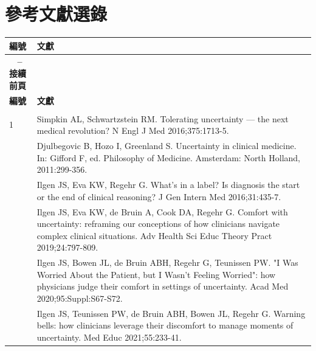\documentclass[12pt,a4paper]{article}
\begin{document}
\section{參考文獻選錄}

\begin{longtable}{>{\raggedright\arraybackslash}p{2cm} >{\raggedright\arraybackslash}p{13cm}}
\toprule
\textbf{\textcolor{emergency_red}{編號}} & \textbf{\textcolor{emergency_red}{文獻}} \\
\midrule
\endfirsthead

\multicolumn{2}{c}%
{{\bfseries \tablename\ \thetable{} -- 接續前頁}} \\
\toprule
\textbf{\textcolor{emergency_red}{編號}} & \textbf{\textcolor{emergency_red}{文獻}} \\
\midrule
\endhead

\midrule \multicolumn{2}{r}{{接續下頁}} \\ \midrule
\endfoot

\bottomrule
\endlastfoot

1 & Simpkin AL, Schwartzstein RM. Tolerating uncertainty — the next medical revolution? N Engl J Med 2016;375:1713-5. \\

2 & Djulbegovic B, Hozo I, Greenland S. Uncertainty in clinical medicine. In: Gifford F, ed. Philosophy of Medicine. Amsterdam: North Holland, 2011:299-356. \\

3 & Ilgen JS, Eva KW, Regehr G. What's in a label? Is diagnosis the start or the end of clinical reasoning? J Gen Intern Med 2016;31:435-7. \\

11 & Ilgen JS, Eva KW, de Bruin A, Cook DA, Regehr G. Comfort with uncertainty: reframing our conceptions of how clinicians navigate complex clinical situations. Adv Health Sci Educ Theory Pract 2019;24:797-809. \\

19 & Ilgen JS, Bowen JL, de Bruin ABH, Regehr G, Teunissen PW. "I Was Worried About the Patient, but I Wasn't Feeling Worried": how physicians judge their comfort in settings of uncertainty. Acad Med 2020;95:Suppl:S67-S72. \\

21 & Ilgen JS, Teunissen PW, de Bruin ABH, Bowen JL, Regehr G. Warning bells: how clinicians leverage their discomfort to manage moments of uncertainty. Med Educ 2021;55:233-41. \\


\end{longtable}
\end{document}
